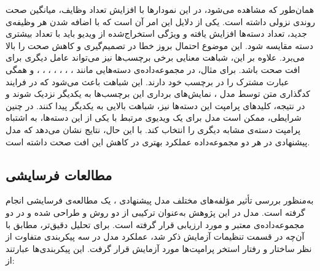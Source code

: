 همان‌طور که مشاهده می‌شود، در این نمودارها با افزایش تعداد وظایف، میانگین صحت روندی نزولی داشته است. یکی از دلایل این امر آن است که با اضافه شدن هر وظیفه‌ی جدید، تعداد دسته‌ها افزایش یافته و ویژگی استخراج‌شده از ویدیو باید با تعداد بیشتری دسته مقایسه شود. این موضوع احتمال بروز خطا در تصمیم‌گیری و کاهش صحت را بالا می‌برد. علاوه بر این، شباهت معنایی برخی برچسب‌ها نیز می‌تواند عامل دیگری برای افت صحت باشد. برای مثال، در مجموعه‌داده‌ی  دسته‌هایی مانند
، ، ، ، ، ، ،  و 
همگی عبارت مشترک  را در برچسب خود دارند. این شباهت باعث می‌شود که در فرایند کدگذاری متن توسط مدل ، نمایش‌های برداری این برچسب‌ها به یکدیگر نزدیک شوند و در نتیجه، کلیدهای پرامپت این دسته‌ها نیز، شباهت بالایی به یکدیگر پیدا کنند. در چنین شرایطی، ممکن است مدل برای یک ویدیوی مرتبط با یکی از این دسته‌ها، به اشتباه پرامپت دسته‌ی مشابه دیگری را انتخاب کند. با این حال، نتایج نشان می‌دهد که مدل پیشنهادی در هر دو مجموعه‌داده عملکرد بهتری در کاهش این افت صحت داشته است.
 \subsection{مطالعات فرسایشی}
به‌منظور بررسی تأثیر مؤلفه‌های مختلف مدل پیشنهادی ، یک مطالعه‌ی فرسایشی
انجام گرفته است. مدل  در این پژوهش به‌عنوان ترکیبی از دو روش  و  طراحی شده و در دو مجموعه‌داده‌ی معتبر  و  مورد ارزیابی قرار گرفته است.
برای تحلیل دقیق‌تر، مطابق با آن‌چه در قسمت تنظیمات آزمایش ذکر شد، عملکرد مدل در سه پیکربندی متفاوت از نظر ساختار و رفتار استخر پرامپت‌ها مورد آزمایش قرار گرفت. این پیکربندی‌ها عبارتند از:

